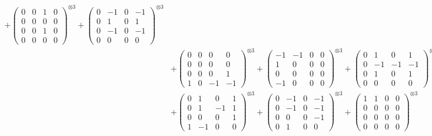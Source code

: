 \documentclass{article}
\begin{document}
{\begin{align}
            + \begin{pmatrix} 0 & 0 & 1 & 0 \\ 0 & 0 & 0 & 0 \\ 0 & 0 & 1 & 0 \\ 0 & 0 & 0 & 0 \end{pmatrix}^{\otimes 3} 
            + \begin{pmatrix} 0 & -1 & 0 & -1 \\ 0 & 1 & 0 & 1 \\ 0 & -1 & 0 & -1 \\ 0 & 0 & 0 & 0 \end{pmatrix}^{\otimes 3} \\
        &+ \label{Rs16-Rc11-Solution-20-c10} \begin{pmatrix} 0 & 0 & 0 & 0 \\ 0 & 0 & 0 & 0 \\ 0 & 0 & 0 & 1 \\ 1 & 0 & -1 & -1 \end{pmatrix}^{\otimes 3} 
            + \begin{pmatrix} -1 & -1 & 0 & 0 \\ 1 & 0 & 0 & 0 \\ 0 & 0 & 0 & 0 \\ -1 & 0 & 0 & 0 \end{pmatrix}^{\otimes 3} 
            + \begin{pmatrix} 0 & 1 & 0 & 1 \\ 0 & -1 & -1 & -1 \\ 0 & 1 & 0 & 1 \\ 0 & 0 & 0 & 0 \end{pmatrix}^{\otimes 3} \\
        &+ \label{Rs16-Rc11-Solution-20-c13} \begin{pmatrix} 0 & 1 & 0 & 1 \\ 0 & 1 & -1 & 1 \\ 0 & 0 & 0 & 1 \\ 1 & -1 & 0 & 0 \end{pmatrix}^{\otimes 3} 
            + \begin{pmatrix} 0 & -1 & 0 & -1 \\ 0 & -1 & 0 & -1 \\ 0 & 0 & 0 & -1 \\ 0 & 1 & 0 & 0 \end{pmatrix}^{\otimes 3} 
            + \begin{pmatrix} 1 & 1 & 0 & 0 \\ 0 & 0 & 0 & 0 \\ 0 & 0 & 0 & 0 \\ 0 & 0 & 0 & 0 \end{pmatrix}^{\otimes 3} \\

\end{align}}
\end{document}

